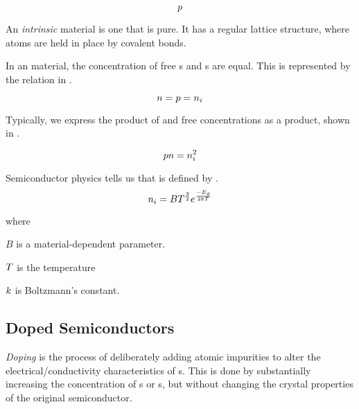 \begin{equation}\label{eq:Concentration_Holes}
  p
\end{equation}

\begin{definition}[Intrinsic]\label{def:Intrinsic}
  An \emph{intrinsic} material is one that is pure.
  It has a regular lattice structure, where atoms are held in place by covalent bonds.
\end{definition}

In an  material, the concentration of free s and s are equal.
This is represented by the relation in .

\begin{equation}\label{eq:Electron_Hole_Concentration-Intrinsic}
  n = p = n_{i}
\end{equation}

Typically, we express the product of  and free  concentrations as a product, shown in .

\begin{equation}\label{eq:Electron_Hole_Concentration}
  p n = n_{i}^{2}
\end{equation}

Semiconductor physics tells us that \HoleElectronConcentration{} is defined by .
\begin{equation}\label{eq:Hole_Electron_Concentration}
  n_{i} = B T^{\frac{3}{2}} e^{\frac{-E_{g}}{2 k T}}
\end{equation}

where
\begin{description}[noitemsep]
\item $B$ is a material-dependent parameter.
\item $T$ is the temperature
\item $k$ is Boltzmann's constant.
\end{description}

\subsection{Doped Semiconductors}\label{subsec:Doped_Semiconductors}
\begin{definition}[Doping]\label{def:Doping}
  \emph{Doping} is the process of deliberately adding atomic impurities to alter the electrical/conductivity characteristics of s.
  This is done by substantially increasing the concentration of s or s, but without changing the crystal properties of the original semiconductor.
\end{definition}

